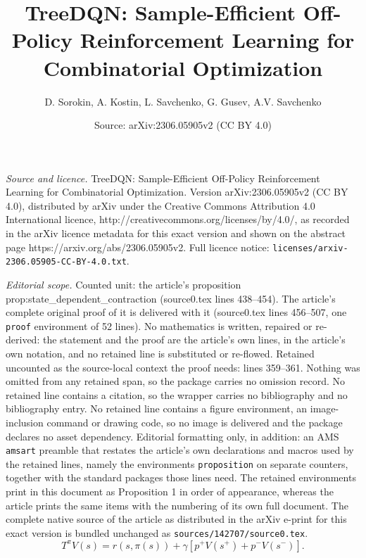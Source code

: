 \documentclass[10pt,a4paper]{amsart}
\title{TreeDQN: Sample-Efficient Off-Policy Reinforcement Learning for Combinatorial Optimization}
\author{D. Sorokin, A. Kostin, L. Savchenko, G. Gusev, A.V. Savchenko}
\date{Source: arXiv:2306.05905v2 (CC BY 4.0)}
\begin{document}
\maketitle

\noindent\emph{Source and licence.} TreeDQN: Sample-Efficient Off-Policy Reinforcement Learning for Combinatorial Optimization. Version arXiv:2306.05905v2 (CC BY 4.0), distributed by arXiv under the Creative Commons Attribution 4.0 International licence, http://creativecommons.org/licenses/by/4.0/, as recorded in the arXiv licence metadata for this exact version and shown on the abstract page https://arxiv.org/abs/2306.05905v2. Full licence notice: \texttt{licenses/arxiv-2306.05905-CC-BY-4.0.txt}.\par\smallskip

\noindent\textit{Editorial scope.} Counted unit: the article's proposition prop:state\_dependent\_contraction (source0.tex lines 438--454). The article's complete original proof of it is delivered with it (source0.tex lines 456--507, one \texttt{proof} environment of 52 lines). No mathematics is written, repaired or re-derived: the statement and the proof are the article's own lines, in the article's own notation, and no retained line is substituted or re-flowed.  Retained uncounted as the source-local context the proof needs: lines 359--361.  Nothing was omitted from any retained span, so the package carries no omission record.  No retained line contains a citation, so the wrapper carries no bibliography and no bibliography entry.  No retained line contains a figure environment, an image-inclusion command or drawing code, so no image is delivered and the package declares no asset dependency.  Editorial formatting only, in addition: an AMS \texttt{amsart} preamble that restates the article's own declarations and macros used by the retained lines, namely the environments \texttt{proposition} on separate counters, together with the standard packages those lines need.  The retained environments print in this document as Proposition 1 in order of appearance, whereas the article prints the same items with the numbering of its own full document.  The complete native source of the article as distributed in the arXiv e-print for this exact version is bundled unchanged as \texttt{sources/142707/source0.tex}.
\begin{equation}
    T^{\pi}V(s) = r(s, \pi(s)) + \gamma \left[ p^+V(s^{+}) + p^-V(s^{-}) \right]. \label{eq:bellman_tree}
\end{equation}
\end{document}
